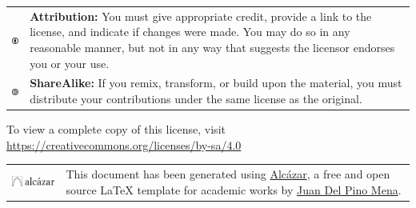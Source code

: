     \noindent
    \begin{tabular}{m{1.5cm} m{13.5cm}}
        \includegraphics[width=2em]{opening/resources/license/by.pdf} & \textbf{Attribution:} You must give appropriate credit, provide a link to the license, and indicate if changes were made. You may do so in any reasonable manner, but not in any way that suggests the licensor endorses you or your use.\\
        \includegraphics[width=2em]{opening/resources/license/sa.pdf} & \textbf{ShareAlike:} If you remix, transform, or build upon the material, you must distribute your contributions under the same license as the original.
    \end{tabular}
    
    \noindent To view a complete copy of this license, visit 
    \href{https://creativecommons.org/licenses/by-nc-sa/4.0/}{https://creativecommons.org/licenses/by-sa/4.0}

\endgroup



\begingroup

    \vspace*{2mm}

    \setlength\tabcolsep{0pt}
    \renewcommand*{\arraystretch}{1.4}
    \renewcommand{\baselinestretch}{0.9}\footnotesize  %
    
    \noindent
    \begin{tabular}{m{3.5cm} m{11.5cm}}
        \includegraphics[width=3cm]{opening/resources/logos/alcazar.pdf} & \noindent This document has been generated using {\href{https://github.com/dpmj/alcazar}{Alcázar}}, a free and open source {\LaTeX} template for academic works by \href{https://www.linkedin.com/in/dpmj/}{Juan Del Pino Mena}. \\
    \end{tabular}

    

\endgroup
